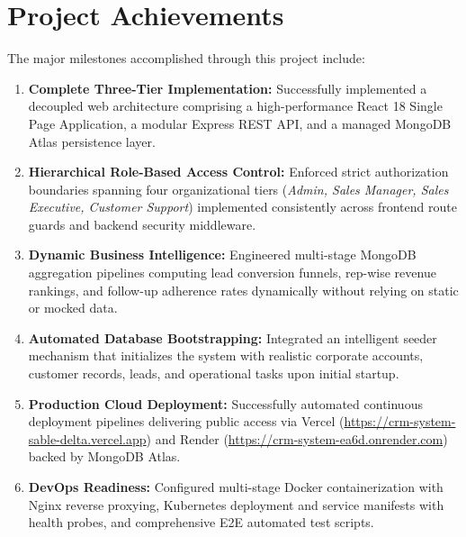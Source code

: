 \section{Project Achievements}
The major milestones accomplished through this project include:
\begin{enumerate}
    \item \textbf{Complete Three-Tier Implementation:} Successfully implemented a decoupled web architecture comprising a high-performance React 18 Single Page Application, a modular Express REST API, and a managed MongoDB Atlas persistence layer.
    \item \textbf{Hierarchical Role-Based Access Control:} Enforced strict authorization boundaries spanning four organizational tiers (\textit{Admin, Sales Manager, Sales Executive, Customer Support}) implemented consistently across frontend route guards and backend security middleware.
    \item \textbf{Dynamic Business Intelligence:} Engineered multi-stage MongoDB aggregation pipelines computing lead conversion funnels, rep-wise revenue rankings, and follow-up adherence rates dynamically without relying on static or mocked data.
    \item \textbf{Automated Database Bootstrapping:} Integrated an intelligent seeder mechanism that initializes the system with realistic corporate accounts, customer records, leads, and operational tasks upon initial startup.
    \item \textbf{Production Cloud Deployment:} Successfully automated continuous deployment pipelines delivering public access via Vercel (\url{https://crm-system-sable-delta.vercel.app}) and Render (\url{https://crm-system-ea6d.onrender.com}) backed by MongoDB Atlas.
    \item \textbf{DevOps Readiness:} Configured multi-stage Docker containerization with Nginx reverse proxying, Kubernetes deployment and service manifests with health probes, and comprehensive E2E automated test scripts.
\end{enumerate}

